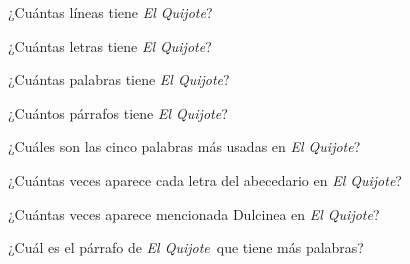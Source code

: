 \def\eq{\emph{El Quijote}}

¿Cuántas líneas tiene \eq?

¿Cuántas letras tiene \eq?

¿Cuántas palabras tiene \eq?

¿Cuántos párrafos tiene \eq?

¿Cuáles son las cinco palabras más usadas en \eq?

¿Cuántas veces aparece cada letra del abecedario en \eq?

¿Cuántas veces aparece mencionada Dulcinea en \eq?

¿Cuál es el párrafo de \eq\ que tiene más palabras?
